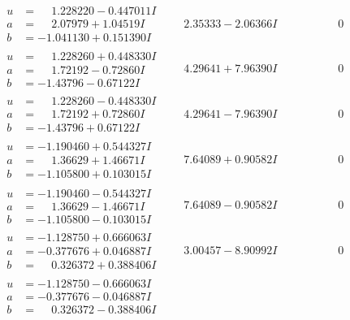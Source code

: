 \documentclass[1p]{elsarticle_modified}
\theoremstyle{definition}
\begin{document}
$$\begin{array}{c|c|c}
\begin{aligned}
u &= \phantom{-}1.228220 - 0.447011 I \\
a &= \phantom{-}2.07979 + 1.04519 I \\
b &= -1.041130 + 0.151390 I\end{aligned}
 & \phantom{-}2.35333 - 2.06366 I & \phantom{-0.000000 } 0 \\ \hline\begin{aligned}
u &= \phantom{-}1.228260 + 0.448330 I \\
a &= \phantom{-}1.72192 - 0.72860 I \\
b &= -1.43796 - 0.67122 I\end{aligned}
 & \phantom{-}4.29641 + 7.96390 I & \phantom{-0.000000 } 0 \\ \hline\begin{aligned}
u &= \phantom{-}1.228260 - 0.448330 I \\
a &= \phantom{-}1.72192 + 0.72860 I \\
b &= -1.43796 + 0.67122 I\end{aligned}
 & \phantom{-}4.29641 - 7.96390 I & \phantom{-0.000000 } 0 \\ \hline\begin{aligned}
u &= -1.190460 + 0.544327 I \\
a &= \phantom{-}1.36629 + 1.46671 I \\
b &= -1.105800 + 0.103015 I\end{aligned}
 & \phantom{-}7.64089 + 0.90582 I & \phantom{-0.000000 } 0 \\ \hline\begin{aligned}
u &= -1.190460 - 0.544327 I \\
a &= \phantom{-}1.36629 - 1.46671 I \\
b &= -1.105800 - 0.103015 I\end{aligned}
 & \phantom{-}7.64089 - 0.90582 I & \phantom{-0.000000 } 0 \\ \hline\begin{aligned}
u &= -1.128750 + 0.666063 I \\
a &= -0.377676 + 0.046887 I \\
b &= \phantom{-}0.326372 + 0.388406 I\end{aligned}
 & \phantom{-}3.00457 - 8.90992 I & \phantom{-0.000000 } 0 \\ \hline\begin{aligned}
u &= -1.128750 - 0.666063 I \\
a &= -0.377676 - 0.046887 I \\
b &= \phantom{-}0.326372 - 0.388406 I\end{aligned}

\end{array}$$
\end{document}
